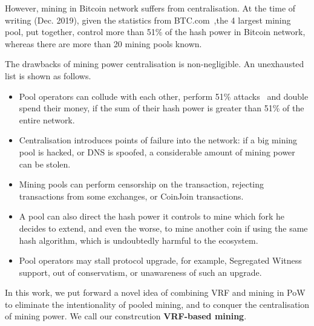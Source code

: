 However, mining in Bitcoin network suffers from centralisation.
At the time of writing (Dec. 2019), given the statistics from BTC.com~\cite{btc-com},the 4 largest mining pool, put together, control more than 51\% of the hash power in Bitcoin network, whereas there are more than 20 mining pools known.

The drawbacks of mining power centralisation is non-negligible.
An unexhausted list is shown as follows.
\begin{itemize}
    \item Pool operators can collude with each other, perform 51\% attacks~\cite{} and double spend their money, if the sum of their hash power is greater than 51\% of the entire network. 
    \item Centralisation introduces points of failure into the network: if a big mining pool is hacked, or DNS is spoofed, a considerable amount of mining power can be stolen.
    \item Mining pools can perform censorship on the transaction, rejecting transactions from some exchanges, or CoinJoin transactions.
    \item A pool can also direct the hash power it controls to mine which fork he decides to extend, and even the worse, to mine another coin if using the same hash algorithm, which is undoubtedly harmful to the ecosystem.
    \item Pool operators may stall protocol upgrade, for example, Segregated Witness~\cite{segwit} support, out of conservatism, or unawareness of such an upgrade.
\end{itemize}

In this work, we put forward a novel idea of combining VRF and mining in PoW to eliminate the intentionality of pooled mining, and to conquer the centralisation of mining power. We call our constrcution \textbf{VRF-based mining}.
